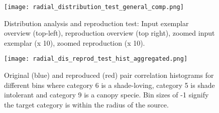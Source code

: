 \begin{figure}
\center
	\texttt{[image: radial\_distribution\_test\_general\_comp.png]}
	\caption{ Distribution analysis and reproduction test: Input exemplar overview (top-left), reproduction overview (top right), zoomed input exemplar (x 10), zoomed reproduction (x 10). }	
	\label{fig:radial_dist_test}
\end{figure}

\begin{figure}
\center
	\texttt{[image: radial\_dis\_reprod\_test\_hist\_aggregated.png]}
	\caption{ Original (blue) and reproduced (red) pair correlation histograms for different bins where category 6 is a shade-loving, category 5 is shade intolerant and category 9 is a canopy specie. Bin sizes of -1 signify the target category is within the radius of the source.}	
	\label{fig:hisogram_comp}
\end{figure}
